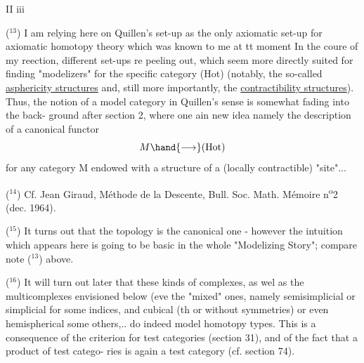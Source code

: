 II iii

($^{13}$) I am relying here on Quillen's set-up as the  only axiomatic
set-up for axiomatic homotopy theory which was known to me at tt moment
In the coure of my reection,  different set-ups re peeling out,
which seem more directly suited for finding "modelizers" for the specific
category (Hot) (notably, the so-called \uline{asphericity structures} and, still
more importantly, the \uline{contractibility structures}). Thus, the notion
of a model category in Quillen's sense is somewhat fading into the back-%
ground after section 2, where one ain new idea  \hand{,} namely the
description of a canonical functor
\[ M \hand{\longrightarrow} (\mathrm{Hot}) \]
for any category M endowed with a structure of a (locally contractible)
"site"...

($^{14}$) Cf. Jean Giraud, Méthode de la Descente, Bull. Soc. Math.
Mémoire n\textsuperscript{o}2 (dec. 1964).

($^{15}$) It turns out that the  topology is   the canonical one -
however the intuition which appears here is going to be basic in the
whole "Modelizing Story";  compare note ($^{13}$) above.

($^{16}$) It will turn out later that these kinds of complexes, as wel
as the multicomplexes envisioned below (eve the "mixed" ones, namely
semisimplicial or simplicial for some indices, and cubical (th or
without symmetries)\hand{,} or even hemispherical\hand{,}   some others,.. do indeed
model homotopy types. This is a consequence of the criterion for test
categories (section 31), and of the fact that a product of test catego-%
ries is again a test category (cf. section 74).

